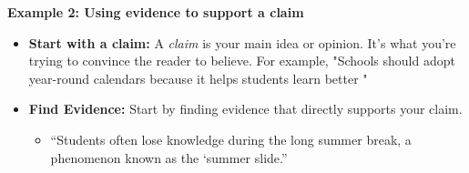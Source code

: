 \documentclass[12pt]{article}
\begin{document}
\vspace{.5em}


\begin{tcolorbox}[colframe=black!60, colback=white, 
coltitle=black, colbacktitle=black!15, fonttitle=\bfseries\Large, 
title=Examples, halign title=center, left=10pt, right=10pt, top=10pt, bottom=15pt]

\textbf{Example 2: Using evidence to support a claim}
\begin{itemize}
    \item \textbf{Start with a claim:} A \textit{claim} is your main idea or opinion. It’s what you’re trying to convince the reader to believe. For example, "Schools should adopt year-round calendars because it helps students learn better "
    \end{itemize}
  \begin{itemize}
                      \item \textbf{Find Evidence:} Start by finding evidence that directly supports your claim.
                      \begin{itemize}
                          \item “Students often lose knowledge during the long summer break, a phenomenon known as the ‘summer slide.”
                         
                      \end{itemize}
                    
     \end{itemize}                  
                     
    




\end{tcolorbox}
\end{document}
